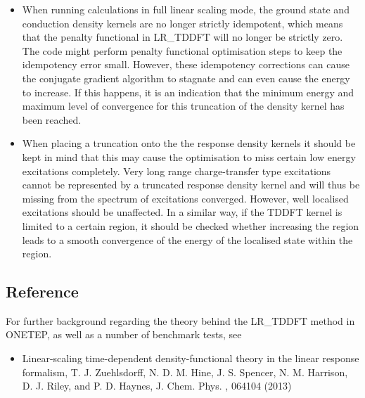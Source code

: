 \documentclass[letterpaper,10pt,english]{sphinxmanual}
\begin{document}
\begin{itemize}
\item {} 
When running calculations in full linear scaling mode, the ground
state and conduction density kernels are no longer strictly
idempotent, which means that the penalty functional in LR\_TDDFT will
no longer be strictly zero. The code might perform penalty functional
optimisation steps to keep the idempotency error small. However,
these idempotency corrections can cause the conjugate gradient
algorithm to stagnate and can even cause the energy to increase. If
this happens, it is an indication that the minimum energy and maximum
level of convergence for this truncation of the density kernel has
been reached.

\item {} 
When placing a truncation onto the the response density kernels it
should be kept in mind that this may cause the optimisation to miss
certain low energy excitations completely. Very long range
charge-transfer type excitations cannot be represented by a truncated
response density kernel and will thus be missing from the spectrum of
excitations converged. However, well localised excitations should be
unaffected. In a similar way, if the TDDFT kernel is limited to a
certain region, it should be checked whether increasing the region
leads to a smooth convergence of the energy of the localised state
within the region.

\end{itemize}


\subsection{Reference}
\label{\detokenize{lr_tddft:reference}}
For further background regarding the theory behind the LR\_TDDFT method
in ONETEP, as well as a number of benchmark tests, see
\begin{itemize}
\item {} 
Linear-scaling time-dependent density-functional theory in the linear
response formalism, T. J. Zuehlsdorff, N. D. M. Hine, J. S. Spencer,
N. M. Harrison, D. J. Riley, and P. D. Haynes, J. Chem. Phys.
, 064104 (2013)

\end{itemize}
\end{document}
